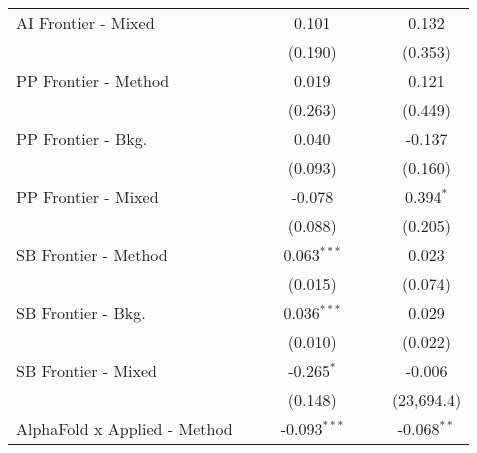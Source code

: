 \begin{tabular}{lcccccc}
   AI Frontier - Mixed            &                &                & 0.101          &                &                & 0.132\\   
                                  &                &                & (0.190)        &                &                & (0.353)\\   
   PP Frontier - Method           &                &                & 0.019          &                &                & 0.121\\   
                                  &                &                & (0.263)        &                &                & (0.449)\\   
   PP Frontier - Bkg.             &                &                & 0.040          &                &                & -0.137\\   
                                  &                &                & (0.093)        &                &                & (0.160)\\   
   PP Frontier - Mixed            &                &                & -0.078         &                &                & 0.394$^{*}$\\   
                                  &                &                & (0.088)        &                &                & (0.205)\\   
   SB Frontier - Method           &                &                & 0.063$^{***}$  &                &                & 0.023\\   
                                  &                &                & (0.015)        &                &                & (0.074)\\   
   SB Frontier - Bkg.             &                &                & 0.036$^{***}$  &                &                & 0.029\\   
                                  &                &                & (0.010)        &                &                & (0.022)\\   
   SB Frontier - Mixed            &                &                & -0.265$^{*}$   &                &                & -0.006\\   
                                  &                &                & (0.148)        &                &                & (23,694.4)\\   
   AlphaFold x Applied - Method   &                &                & -0.093$^{***}$ &                &                & -0.068$^{**}$\\   

\end{tabular}
